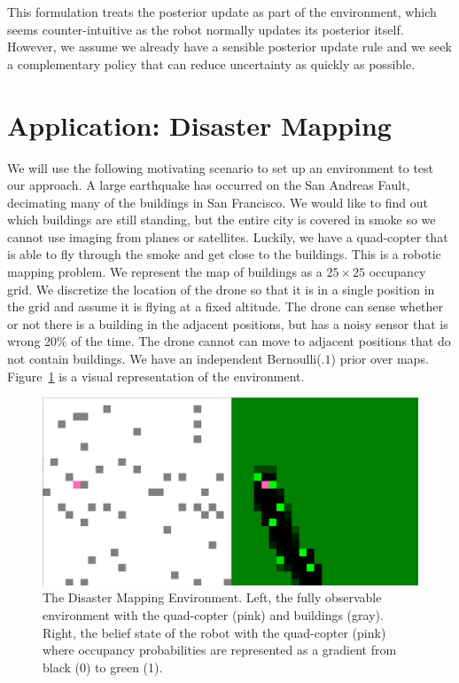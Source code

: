 \documentclass{article}
\begin{document}
This formulation treats the posterior update as part of the environment, which seems counter-intuitive as the robot normally updates its posterior itself. However, we assume we already have a sensible posterior update rule and we seek a complementary policy that can reduce uncertainty as quickly as possible.

\section{Application: Disaster Mapping}

We will use the following motivating scenario to set up an environment to test our approach. A large earthquake has occurred on the San Andreas Fault, decimating many of the buildings in San Francisco. We would like to find out which buildings are still standing, but the entire city is covered in smoke so we cannot use imaging from planes or satellites. Luckily, we have a quad-copter that is able to fly through the smoke and get close to the buildings. This is a robotic mapping problem. We represent the map of buildings as a $25 \times 25$ occupancy grid. We discretize the location of the drone so that it is in a single position in the grid and assume it is flying at a fixed altitude. The drone can sense whether or not there is a building in the adjacent positions, but has a noisy sensor that is wrong 20\% of the time. The drone cannot can move to adjacent positions that do not contain buildings. We have an independent Bernoulli($.1$) prior over maps. Figure~\ref{fig:env} is a visual representation of the environment.

\begin{figure}[H]
    \centering
    \label{fig:env}
    \caption{The Disaster Mapping Environment. Left, the fully observable environment with the quad-copter (pink) and buildings (gray). Right, the belief state of the robot with the quad-copter (pink) where occupancy probabilities are represented as a gradient from black (0) to green (1).}
    \medskip
    \includegraphics[scale=.25]{figs/map.png}
\end{figure}
\end{document}
